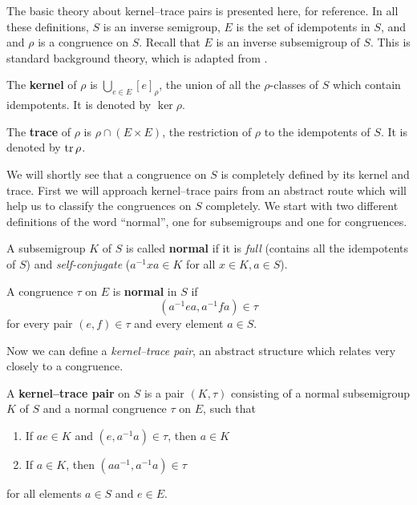 The basic theory about kernel--trace pairs is presented here, for reference.  In
all these definitions, $S$ is an inverse semigroup, $E$ is the set of
idempotents in $S$, and and $\rho$ is a congruence on $S$.  Recall that $E$ is
an inverse subsemigroup of $S$.  This is standard background theory, which is
adapted from \cite[\S 5.3]{howie}.

\begin{definition}
  \label{def:kernel-cong}
  The \textbf{kernel} of $\rho$ is $\bigcup_{e \in E} [e]_\rho$, the union of
  all the $\rho$-classes of $S$ which contain idempotents.  It is denoted by
  $\ker\rho$.
\end{definition}

\begin{definition}
  \label{def:trace}
  The \textbf{trace} of $\rho$ is $\rho \cap (E \times E)$, the restriction of
  $\rho$ to the idempotents of $S$.  It is denoted by $\operatorname{tr}\rho$.
\end{definition}

We will shortly see that a congruence on $S$ is completely defined by its kernel
and trace.  First we will approach kernel--trace pairs from an abstract route
which will help us to classify the congruences on $S$ completely.  We start with
two different definitions of the word ``normal'', one for subsemigroups and one
for congruences.

\begin{definition}
  \label{def:kernel-normal}
  A subsemigroup $K$ of $S$ is called \textbf{normal} if it is
  \textit{full} (contains all the idempotents of $S$) and
  \textit{self-conjugate} ($a^{-1}xa \in K$ for all $x \in K, a \in S$).
\end{definition}

\begin{definition}
  \label{def:trace-normal}
  A congruence $\tau$ on $E$ is \textbf{normal} in $S$ if
  $$(a^{-1}ea,a^{-1}fa) \in \tau$$
  for every pair $(e,f) \in \tau$ and every element $a \in S$.
\end{definition}

Now we can define a \textit{kernel--trace pair}, an abstract structure which
relates very closely to a congruence.

\begin{definition}
  \label{def:kernel-trace-pair}
  A \textbf{kernel--trace pair} on $S$ is a pair $(K,\tau)$ consisting of a
  normal subsemigroup $K$ of $S$ and a normal congruence $\tau$ on $E$, such
  that
  \begin{enumerate}[\rm(1)]
  \item If $ae \in K$ and $(e,a^{-1}a) \in \tau$, then $a \in K$
  \item If $a \in K$, then $(aa^{-1},a^{-1}a) \in \tau$
  \end{enumerate}
  for all elements $a \in S$ and $e \in E$.
\end{definition}

